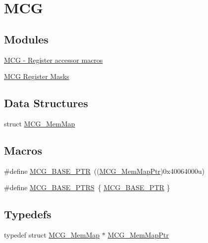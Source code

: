 \hypertarget{group___m_c_g___peripheral}{}\section{M\+CG}
\label{group___m_c_g___peripheral}
\subsection*{Modules}
\begin{DoxyCompactItemize}
\item 
\hyperlink{group___m_c_g___register___accessor___macros}{M\+C\+G -\/ Register accessor macros}
\item 
\hyperlink{group___m_c_g___register___masks}{M\+C\+G Register Masks}
\end{DoxyCompactItemize}
\subsection*{Data Structures}
\begin{DoxyCompactItemize}
\item 
struct \hyperlink{struct_m_c_g___mem_map}{M\+C\+G\+\_\+\+Mem\+Map}
\end{DoxyCompactItemize}
\subsection*{Macros}
\begin{DoxyCompactItemize}
\item 
\#define \hyperlink{group___m_c_g___peripheral_gaceefc72e93a47a35f59a31c57dddf41b}{M\+C\+G\+\_\+\+B\+A\+S\+E\+\_\+\+P\+TR}~((\hyperlink{group___m_c_g___peripheral_ga1cb93dd00863c129e7753ec45a7c3563}{M\+C\+G\+\_\+\+Mem\+Map\+Ptr})0x40064000u)
\item 
\#define \hyperlink{group___m_c_g___peripheral_ga3e6aec328b7327acc1f7bff70bec388c}{M\+C\+G\+\_\+\+B\+A\+S\+E\+\_\+\+P\+T\+RS}~\{ \hyperlink{group___m_c_g___peripheral_gaceefc72e93a47a35f59a31c57dddf41b}{M\+C\+G\+\_\+\+B\+A\+S\+E\+\_\+\+P\+TR} \}
\end{DoxyCompactItemize}
\subsection*{Typedefs}
\begin{DoxyCompactItemize}
\item 
typedef struct \hyperlink{struct_m_c_g___mem_map}{M\+C\+G\+\_\+\+Mem\+Map} $\ast$ \hyperlink{group___m_c_g___peripheral_ga1cb93dd00863c129e7753ec45a7c3563}{M\+C\+G\+\_\+\+Mem\+Map\+Ptr}
\end{DoxyCompactItemize}


